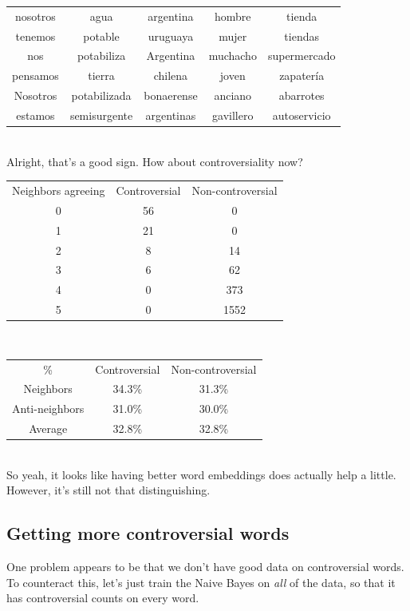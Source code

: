 \documentclass[11pt]{article} %
\begin{document}
\begin{tabular}{c|c|c|c|c}
\rowcolor{gray!50} nosotros & agua & argentina & hombre & tienda \\
tenemos & potable & uruguaya & mujer& tiendas \\
nos & potabiliza & Argentina & muchacho & supermercado \\
pensamos & tierra & chilena & joven & zapater\'ia\\
Nosotros & potabilizada & bonaerense & anciano & abarrotes\\
estamos & semisurgente & argentinas & gavillero & autoservicio \\
\end{tabular} \\

Alright, that's a good sign. How about controversiality now?\\

\begin{tabular}{c|c|c}
\rowcolor{gray!50} Neighbors agreeing & Controversial & Non-controversial \\
0 & 56 & 0 \\
1 & 21 & 0 \\
2 & 8 & 14 \\
3 & 6 & 62 \\
4 & 0 & 373 \\
5 & 0 &1552 \end{tabular}\\

\begin{tabular}{c|c|c}
\rowcolor{gray!50}\%   & Controversial & Non-controversial \\
Neighbors & 34.3\% &  31.3\%\\
Anti-neighbors & 31.0\% & 30.0\% \\
Average & 32.8\% &  32.8\% \end{tabular}\\

So yeah, it looks like having better word embeddings does actually help a little. However, it's still not that distinguishing.

\subsection{Getting more controversial words}

One problem appears to be that we don't have good data on controversial words. To counteract this, let's just train the Naive Bayes on \emph{all} of the data, so that it has controversial counts on every word. 
\end{document}
